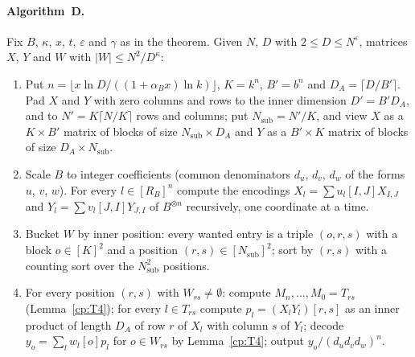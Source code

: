 \documentclass[11pt]{article}
\theoremstyle{definition}
\theoremstyle{remark}
\providecommand{\eps}{\varepsilon}
\newcommand{\abs}[1]{\lvert #1\rvert}
\newcommand{\alB}{\alpha_B}                   %
\newcommand{\RB}{R_B}                         %
\newcommand{\AlgD}{Algorithm~D}                             %
\begin{document}
\paragraph{\AlgD.} Fix $B$, $\kappa$, $x$, $t$, $\eps$ and $\gamma$ as in the theorem. Given $N$, $D$ with $2\le D\le N^\eps$, matrices $X$, $Y$ and $W$ with $\abs W\le N^2/D^\kappa$:
\begin{enumerate}
\item Put $n=\lfloor x\ln D/((1+\alB x)\ln k)\rfloor$, $K=k^n$, $B'=b^n$ and $D_A=\lceil D/B'\rceil$. Pad $X$ and $Y$ with zero columns and rows to the inner dimension $D'=B'D_A$, and to $N'=K\lceil N/K\rceil$ rows and columns; put $N_{\mathrm{sub}}=N'/K$, and view $X$ as a $K\times B'$ matrix of blocks of size $N_{\mathrm{sub}}\times D_A$ and $Y$ as a $B'\times K$ matrix of blocks of size $D_A\times N_{\mathrm{sub}}$.
\item Scale $B$ to integer coefficients (common denominators $d_u$, $d_v$, $d_w$ of the forms $u$, $v$, $w$). For every $l\in[\RB]^n$ compute the encodings $X_l=\sum u_l[I,J]X_{I,J}$ and $Y_l=\sum v_l[J,I]Y_{J,I}$ of $B^{\otimes n}$ recursively, one coordinate at a time.
\item Bucket $W$ by inner position: every wanted entry is a triple $(o,r,s)$ with a block $o\in[K]^2$ and a position $(r,s)\in[N_{\mathrm{sub}}]^2$; sort by $(r,s)$ with a counting sort over the $N_{\mathrm{sub}}^2$ positions.
\item For every position $(r,s)$ with $W_{rs}\ne\emptyset$: compute $M_n,\dots,M_0=T_{rs}$ (Lemma~\ref{cp:T4}); for every $l\in T_{rs}$ compute $p_l=(X_lY_l)[r,s]$ as an inner product of length $D_A$ of row $r$ of $X_l$ with column $s$ of $Y_l$; decode $y_o=\sum_lw_l[o]p_l$ for $o\in W_{rs}$ by Lemma~\ref{cp:T4}; output $y_o/(d_ud_vd_w)^n$.
\end{enumerate}
\end{document}
